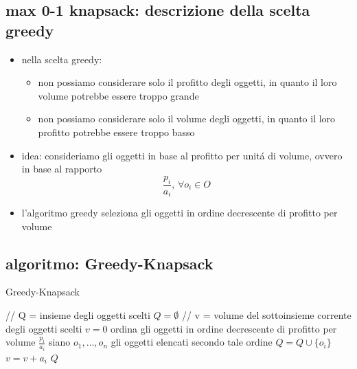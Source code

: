 \subsection*{max 0-1 knapsack: descrizione della scelta greedy}
\begin{flushleft}
	\begin{itemize}
		\item nella scelta greedy:
		\begin{itemize}
			\item non possiamo considerare solo il profitto degli oggetti, in quanto il loro volume potrebbe essere troppo grande
			\item non possiamo considerare solo il volume degli oggetti, in quanto il loro profitto potrebbe essere troppo basso
		\end{itemize}
		\item idea: consideriamo gli oggetti in base al profitto per unit\'a di volume, ovvero in base al rapporto $$\frac{p_i}{a_i}\text{, }\forall o_i\in O$$
		\item l'algoritmo greedy seleziona gli oggetti in ordine decrescente di profitto per volume
	\end{itemize}
\end{flushleft}


\newpage
\subsection*{algoritmo: Greedy-Knapsack}
\begin{flushleft}
	\begin{algorithm}
		\caption{Greedy-Knapsack}
		\begin{algorithmic}
			\STATE \color{gray} // Q = insieme degli oggetti scelti \color{black}
			\STATE $Q=\emptyset$
			\STATE \color{gray} // v = volume del sottoinsieme corrente degli oggetti scelti \color{black}
			\STATE $v=0$
			\STATE ordina gli oggetti in ordine decrescente di profitto per volume $\frac{p_i}{a_i}$
			\STATE siano $o_1,\ldots,o_n$ gli oggetti elencati secondo tale ordine
					\STATE $Q=Q\cup\{o_i\}$
					\STATE $v=v+a_i$
				\ENDIF
			\ENDFOR
			\RETURN $Q$
		\end{algorithmic}
	\end{algorithm}
\end{flushleft}

